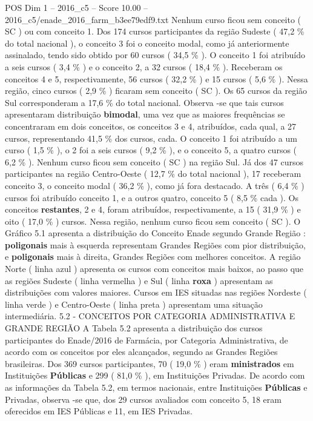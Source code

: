 \begin{textsample}{POS Dim 1 – 2016\_c5 – Score 10.00 – 2016\_c5/enade\_2016\_farm\_b3ee79edf9.txt}
Nenhum curso ficou sem conceito ( SC ) ou com conceito 1.
Dos 174 cursos participantes da região Sudeste ( 47,2 \% do total nacional ), o conceito 3 foi o conceito modal, como já anteriormente assinalado, tendo sido obtido por 60 cursos ( 34,5 \% ).
O conceito 1 foi atribuído a seis cursos ( 3,4 \% ) e o conceito 2, a 32 cursos ( 18,4 \% ).
Receberam os conceitos 4 e 5, respectivamente, 56 cursos ( 32,2 \% ) e 15 cursos ( 5,6 \% ).
Nessa região, cinco cursos ( 2,9 \% ) ficaram sem conceito ( SC ).
Os 65 cursos da região Sul corresponderam a 17,6 \% do total nacional.
Observa -se que tais cursos apresentaram distribuição \textbf{bimodal}, uma vez que as maiores frequências se concentraram em dois conceitos, os conceitos 3 e 4, atribuídos, cada qual, a 27 cursos, representando 41,5 \% dos cursos, cada.
O conceito 1 foi atribuído a um curso ( 1,5 \% ), o 2 foi a seis cursos ( 9,2 \% ), e o conceito 5, a quatro cursos ( 6,2 \% ).
Nenhum curso ficou sem conceito ( SC ) na região Sul.
Já dos 47 cursos participantes na região Centro-Oeste ( 12,7 \% do total nacional ), 17 receberam conceito 3, o conceito modal ( 36,2 \% ), como já fora destacado.
A três ( 6,4 \% ) cursos foi atribuído conceito 1, e a outros quatro, conceito 5 ( 8,5 \% cada ).
Os conceitos \textbf{restantes}, 2 e 4, foram atribuídos, respectivamente, a 15 ( 31,9 \% ) e oito ( 17,0 \% ) cursos.
Nessa região, nenhum curso ficou sem conceito ( SC ).
O Gráfico 5.1 apresenta a distribuição do Conceito Enade segundo Grande Região : \textbf{poligonais} mais à esquerda representam Grandes Regiões com pior distribuição, e \textbf{poligonais} mais à direita, Grandes Regiões com melhores conceitos.
A região Norte ( linha azul ) apresenta os cursos com conceitos mais baixos, ao passo que as regiões Sudeste ( linha vermelha ) e Sul ( linha \textbf{roxa} ) apresentam as distribuições com valores maiores.
Cursos em IES situadas nas regiões Nordeste ( linha verde ) e Centro-Oeste ( linha preta ) apresentam uma situação intermediária. 5.2 - CONCEITOS POR CATEGORIA ADMINISTRATIVA E GRANDE REGIÃO A Tabela 5.2 apresenta a distribuição dos cursos participantes do Enade/2016 de Farmácia, por Categoria Administrativa, de acordo com os conceitos por eles alcançados, segundo as Grandes Regiões brasileiras.
Dos 369 cursos participantes, 70 ( 19,0 \% ) eram \textbf{ministrados} em Instituições \textbf{Públicas} e 299 ( 81,0 \% ), em Instituições Privadas.
De acordo com as informações da Tabela 5.2, em termos nacionais, entre Instituições \textbf{Públicas} e Privadas, observa -se que, dos 29 cursos avaliados com conceito 5, 18 eram oferecidos em IES Públicas e 11, em IES Privadas.

\end{textsample}
